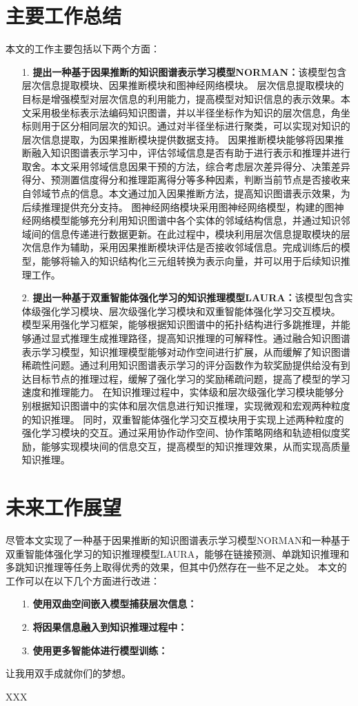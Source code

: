 \documentclass[algorithmlist, AutoFakeBold, AutoFakeSlant, figurelist, tablelist, nomlist, masters]{seuthesix}
\begin{document}
\section{主要工作总结}
本文的工作主要包括以下两个方面：
\begin{itemize}
  \item [1.]\textbf{提出一种基于因果推断的知识图谱表示学习模型NORMAN：}该模型包含层次信息提取模块、因果推断模块和图神经网络模块。
  层次信息提取模块的目标是增强模型对层次信息的利用能力，提高模型对知识信息的表示效果。本文采用极坐标表示法编码知识图谱，并以半径坐标作为知识的层次信息，角坐标则用于区分相同层次的知识。通过对半径坐标进行聚类，可以实现对知识的层次信息提取，为因果推断模块提供数据支持。
  因果推断模块能够将因果推断融入知识图谱表示学习中，评估邻域信息是否有助于进行表示和推理并进行取舍。本文采用邻域信息因果干预的方法，综合考虑层次差异得分、决策差异得分、预测置信度得分和推理距离得分等多种因素，判断当前节点是否接收来自邻域节点的信息。本文通过加入因果推断方法，提高知识图谱表示效果，为后续推理提供充分支持。
  图神经网络模块采用图神经网络模型，构建的图神经网络模型能够充分利用知识图谱中各个实体的邻域结构信息，并通过知识邻域间的信息传递进行数据更新。在此过程中，模块利用层次信息提取模块的层次信息作为辅助，采用因果推断模块评估是否接收邻域信息。完成训练后的模型，能够将输入的知识结构化三元组转换为表示向量，并可以用于后续知识推理工作。
  \item [2.]\textbf{提出一种基于双重智能体强化学习的知识推理模型LAURA：}该模型包含实体级强化学习模块、层次级强化学习模块和双重智能体强化学习交互模块。
  模型采用强化学习框架，能够根据知识图谱中的拓扑结构进行多跳推理，并能够通过显式推理生成推理路径，提高知识推理的可解释性。通过融合知识图谱表示学习模型，知识推理模型能够对动作空间进行扩展，从而缓解了知识图谱稀疏性问题。通过利用知识图谱表示学习的评分函数作为软奖励提供给没有到达目标节点的推理过程，缓解了强化学习的奖励稀疏问题，提高了模型的学习速度和推理能力。
  在知识推理过程中，实体级和层次级强化学习模块能够分别根据知识图谱中的实体和层次信息进行知识推理，实现微观和宏观两种粒度的知识推理。
  同时，双重智能体强化学习交互模块用于实现上述两种粒度的强化学习模块的交互。通过采用协作动作空间、协作策略网络和轨迹相似度奖励，能够实现模块间的信息交互，提高模型的知识推理效果，从而实现高质量知识推理。
\end{itemize}

\section{未来工作展望}
尽管本文实现了一种基于因果推断的知识图谱表示学习模型NORMAN和一种基于双重智能体强化学习的知识推理模型LAURA，能够在链接预测、单跳知识推理和多跳知识推理等任务上取得优秀的效果，但其中仍然存在一些不足之处。
本文的工作可以在以下几个方面进行改进：
\begin{itemize}
  \item [1.]\textbf{使用双曲空间嵌入模型捕获层次信息：}
  \item [2.]\textbf{将因果信息融入到知识推理过程中：}
  \item [3.]\textbf{使用更多智能体进行模型训练：}
\end{itemize}

\acknowledgement
让我用双手成就你们的梦想。


% 
% 
% 


\appendix
{}
XXX
\end{document}
